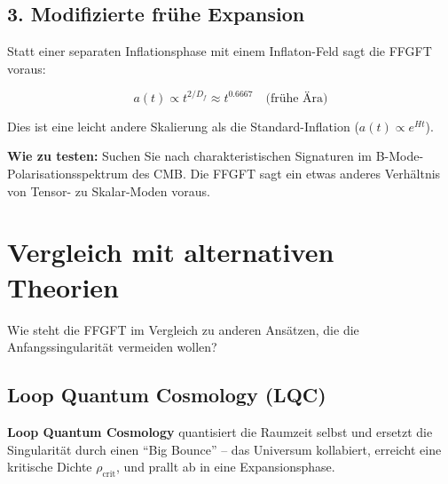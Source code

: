 	\subsection{3. Modifizierte frühe Expansion}
	
	Statt einer separaten Inflationsphase mit einem Inflaton-Feld sagt die FFGFT voraus:
	
	\begin{equation}
		a(t) \propto t^{2/D_f} \approx t^{0.6667} \quad \text{(frühe Ära)}
	\end{equation}
	
	Dies ist eine leicht andere Skalierung als die Standard-Inflation ($a(t) \propto e^{Ht}$).
	
	\textbf{Wie zu testen:} Suchen Sie nach charakteristischen Signaturen im B-Mode-Polarisationsspektrum des CMB. Die FFGFT sagt ein etwas anderes Verhältnis von Tensor- zu Skalar-Moden voraus.
	
	\section{Vergleich mit alternativen Theorien}
	
	Wie steht die FFGFT im Vergleich zu anderen Ansätzen, die die Anfangssingularität vermeiden wollen?
	
	\subsection{Loop Quantum Cosmology (LQC)}
	
	\textbf{Loop Quantum Cosmology} quantisiert die Raumzeit selbst und ersetzt die Singularität durch einen \enquote{Big Bounce} -- das Universum kollabiert, erreicht eine kritische Dichte $\rho_{\text{crit}}$, und prallt ab in eine Expansionsphase.
	
	\begin{center}
		\small
	\end{center}
	
